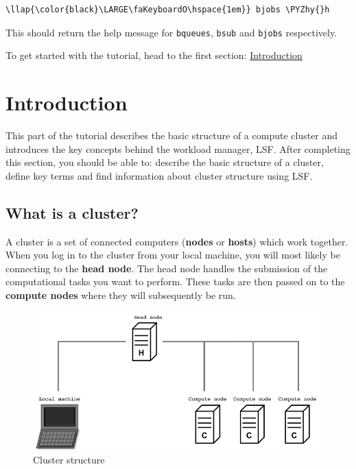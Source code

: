 \documentclass[11pt]{article}
\makeatletter
\def\maxwidth{\ifdim\Gin@nat@width>\linewidth\linewidth
    \else\Gin@nat@width\fi}
\let\Oldincludegraphics\includegraphics
\renewcommand{\includegraphics}[1]{\Oldincludegraphics[width=.8\maxwidth, height=.55\textheight, keepaspectratio]{#1}}
\def\PYZhy{\char`\-}
\makeatother
\begin{document}
\begin{terminalinput}
\begin{Verbatim}[commandchars=\\\{\}]
\llap{\color{black}\LARGE\faKeyboardO\hspace{1em}} bjobs \PYZhy{}h
\end{Verbatim}
\end{terminalinput}


    This should return the help message for \texttt{bqueues}, \texttt{bsub}
and \texttt{bjobs} respectively.

To get started with the tutorial, head to the first section:
\href{intro.ipynb}{Introduction}





\newpage






    \section{Introduction}\label{introduction}

This part of the tutorial describes the basic structure of a compute
cluster and introduces the key concepts behind the workload manager,
LSF. After completing this section, you should be able to: describe the
basic structure of a cluster, define key terms and find information
about cluster structure using LSF.

\subsection{What is a cluster?}\label{what-is-a-cluster}

A cluster is a set of connected computers (\textbf{nodes} or
\textbf{hosts}) which work together. When you log in to the cluster from
your local machine, you will most likely be connecting to the
\textbf{head node}. The head node handles the submission of the
computational tasks you want to perform. These tasks are then passed on
to the \textbf{compute nodes} where they will subsequently be run.

    \begin{figure}[!h]
\centering
\includegraphics{images/cluster_structure.png}
\caption{Cluster structure}
\end{figure}
\end{document}
